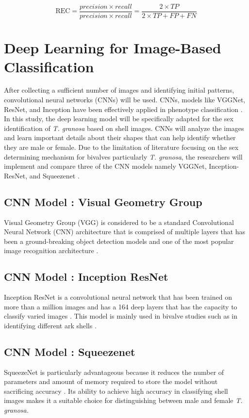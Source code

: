 \begin{equation}
	\text{REC} = \frac{ precision \times recall }{precision \times recall }= \frac{2 \times TP}{2 \times TP + FP + FN}
	\label{eq:f1}
\end{equation}

\section{ Deep Learning for Image-Based Classification}
\label{sec:deeplearning}
After collecting a sufficient number of images and identifying initial patterns, convolutional neural networks (CNNs) will be used. CNNs, models like VGGNet, ResNet, and Inception have been effectively applied in phenotype classification \cite{kim2024}. In this study, the deep learning model will be specifically adapted for the sex identification of \textit{T. granosa} based on shell images. CNNs will analyze the images and learn important details about their shapes that can help identify whether they are male or female. Due to the limitation of literature focusing on the sex determining mechanism for bivalves particularly \textit{T. granosa}, the researchers will implement and compare three of the CNN models namely VGGNet, Inception-ResNet, and Squeezenet . 

\subsection{CNN Model : Visual Geometry Group}
Visual Geometry Group (VGG) is considered to be a standard Convolutional Neural Network (CNN) architecture that is comprised of multiple layers that has been a ground-breaking object detection models and one of the most popular image recognition architecture \cite{boesch2021}. 

\subsection{CNN Model : Inception ResNet}
Inception ResNet is a convolutional neural network that has been trained on more than a million images and has a  164 deep layers that has the capacity to classify varied images \cite{mathworks}. This model is mainly used in bivalve studies such as in identifying different ark shells \cite{kim2024}.  

\subsection{CNN Model : Squeezenet}
SqueezeNet is particularly advantageous because it reduces the number of parameters and amount of memory required to store the model without sacrificing accuracy \cite{koonce2021}. Its ability to achieve high accuracy in classifying shell images makes it a suitable choice for distinguishing between male and female \textit{T. granosa.}

